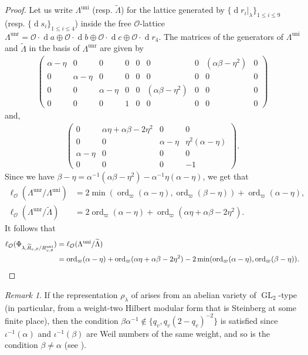 \documentclass[a4paper, notitlepage, 10pt]{amsart}
\theoremstyle{plain} %
\theoremstyle{definition} %
\theoremstyle{remark} %
\newtheorem{remark}[theorem]{Remark}
\numberwithin{equation}{section}
\newcommand{\GL}{\operatorname{GL}} %
\newcommand{\dd}{\operatorname{d}} %
\newcommand{\ord}{\operatorname{ord}} %
\newcommand{\uni}{\operatorname{uni}}
\newcommand{\unr}{\operatorname{unr}}
\begin{document}
\begin{proof}
Let us write $\Lambda^{\uni}$ (resp. $\widetilde{\Lambda}$) for the lattice generated by $\{\dd r_i|_{\lambda}\}_{1\le i\le 9}$ (resp. $\{\dd s_i\}_{1\le i\le 4}$) inside the free $\mathcal{O}$-lattice $\Lambda^{\unr}=\mathcal{O}\cdot \dd a \oplus \mathcal{O}\cdot \dd b \oplus \mathcal{O}\cdot \dd c \oplus \mathcal{O}\cdot \dd r_4$. The matrices of the generators of $\Lambda^{\uni}$ and $\widetilde{\Lambda}$ in the basis of $\Lambda^{\unr}$ are given by
\begin{align*}
    \begin{pmatrix}
        \alpha-\eta & 0 & 0 & 0 & 0 & 0 & 0 & (\alpha\beta-\eta^2) & 0
        \\ 0 & \alpha-\eta & 0 & 0 & 0 & 0 & 0 & 0 & 0
        \\ 0 & 0 & \alpha-\eta & 0 & 0 & (\alpha\beta-\eta^2) & 0 & 0 & 0
        \\ 0 & 0 & 0 & 1 & 0 & 0 & 0 & 0 & 0
    \end{pmatrix}
\end{align*}
and,
\begin{align*}
    \begin{pmatrix}
        0 & \alpha\eta+\alpha\beta-2\eta^2 & 0 & 0
        \\ 0 & 0 & \alpha-\eta & \eta^2(\alpha-\eta)
        \\ \alpha-\eta & 0 & 0 & 0 
        \\ 0 & 0 & 0 & -1
    \end{pmatrix}.
\end{align*}
Since we have  $ \beta-\eta=\alpha^{-1}(\alpha\beta-\eta^2)-\alpha^{-1}\eta(\alpha-\eta)$, we get that 
\begin{align*}
    \ell_{\mathcal{O}}(\Lambda^{\unr}/\Lambda^{\uni}) &=2 \min(\ord_{\varpi}(\alpha-\eta),\ord_{\varpi}(\beta-\eta))+\ord_{\varpi}(\alpha-\eta),
    \\ \ell_{\mathcal{O}}(\Lambda^{\unr}/\widetilde{\Lambda})&= 2 \ord_{\varpi}(\alpha-\eta)+\ord_{\varpi}( \alpha\eta+\alpha\beta-2\eta^2).
\end{align*}
It follows that
\begin{align*}
    \ell_{\mathcal{O}}(\Phi_{\lambda,\widetilde{R}_{v,\theta}/R^{\uni}_{v,\theta}})&=\ell_{\mathcal{O}}(\Lambda^{\uni}/\widetilde{\Lambda})
    \\ &=\ord_{\varpi}(\alpha-\eta)+ \ord_{\varpi}( \alpha\eta+\alpha\beta-2\eta^2) -2\min(\ord_{\varpi}(\alpha-\eta),\ord_{\varpi}(\beta-\eta)). \qedhere
\end{align*} 
\end{proof}
\begin{remark}
    If the representation $\rho_{\lambda}$ of  arises from an abelian variety of $\GL_2$-type (in particular, from a weight-two Hilbert modular form that is Steinberg at some finite place), then the condition $\beta\alpha^{-1}\not\in \{q_v,q_v(2-q_v)^{-2}\}$ is satisfied since $\iota^{-1}(\alpha)$ and $\iota^{-1}(\beta)$ are Weil numbers of the same weight, and so is the condition $\beta\neq \alpha$ (see \cite[Theorem 2.1]{CE98}).  
\end{remark}
\end{document}
